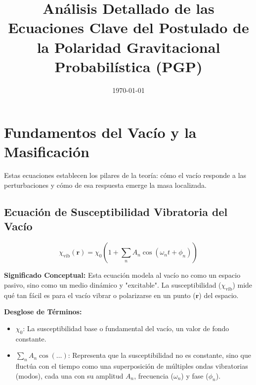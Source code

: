 \documentclass{article}
\title{Análisis Detallado de las Ecuaciones Clave del Postulado de la Polaridad Gravitacional Probabilística (PGP)}
\date{\today} %
\begin{document}
\maketitle %


\section{Fundamentos del Vacío y la Masificación}

Estas ecuaciones establecen los pilares de la teoría: cómo el vacío responde a las perturbaciones y cómo de esa respuesta emerge la masa localizada.

\subsection{Ecuación de Susceptibilidad Vibratoria del Vacío}

\begin{equation*}
\chi_{\text{vib}}(\mathbf{r}) = \chi_0 \left(1 + \sum_n A_n \cos(\omega_n t + \phi_n)\right)
\end{equation*}

\textbf{Significado Conceptual:} Esta ecuación modela al vacío no como un espacio pasivo, sino como un medio dinámico y "excitable". La susceptibilidad ($\chi_{\text{vib}}$) mide qué tan fácil es para el vacío vibrar o polarizarse en un punto ($\mathbf{r}$) del espacio.

\textbf{Desglose de Términos:}
\begin{itemize}
    \item $\chi_0$: La susceptibilidad base o fundamental del vacío, un valor de fondo constante.
    \item $\sum_n A_n \cos(\dots)$: Representa que la susceptibilidad no es constante, sino que fluctúa con el tiempo como una superposición de múltiples ondas vibratorias (modos), cada una con su amplitud $A_n$, frecuencia ($\omega_n$) y fase ($\phi_n$).
\end{itemize}
\end{document}

